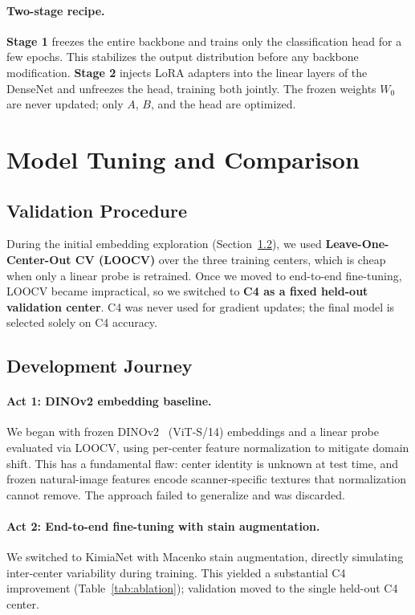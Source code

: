 \documentclass{midl}
\begin{document}
\paragraph{Two-stage recipe.}
\textbf{Stage 1} freezes the entire backbone and trains only the classification head for a
few epochs. This stabilizes the output distribution before any backbone modification.
\textbf{Stage 2} injects LoRA adapters into the linear layers of the DenseNet and unfreezes
the head, training both jointly. The frozen weights $W_0$ are never updated; only $A$, $B$,
and the head are optimized.

\section{Model Tuning and Comparison}

\subsection{Validation Procedure}

During the initial embedding exploration (Section~\ref{sec:journey}), we used
\textbf{Leave-One-Center-Out CV (LOOCV)} over the three training centers, which is cheap
when only a linear probe is retrained. Once we moved to end-to-end fine-tuning, LOOCV
became impractical, so we switched to \textbf{C4 as a fixed held-out validation center}.
C4 was never used for gradient updates; the final model is selected solely on C4 accuracy.

\subsection{Development Journey}
\label{sec:journey}

\paragraph{Act 1: DINOv2 embedding baseline.}
We began with frozen DINOv2~\citep{oquab2024dinov2} (ViT-S/14) embeddings and a linear
probe evaluated via LOOCV, using per-center feature normalization to mitigate domain shift.
This has a fundamental flaw: center identity is unknown at test time, and frozen
natural-image features encode scanner-specific textures that normalization cannot remove.
The approach failed to generalize and was discarded.

\paragraph{Act 2: End-to-end fine-tuning with stain augmentation.}
We switched to KimiaNet with Macenko stain augmentation, directly simulating inter-center
variability during training. This yielded a substantial C4 improvement
(Table~\ref{tab:ablation}); validation moved to the single held-out C4 center.
\end{document}
